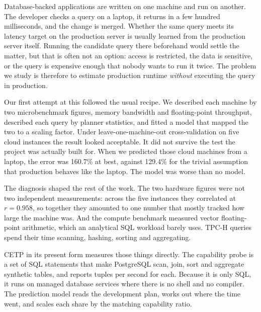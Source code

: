 \documentclass[runningheads]{llncs}
\begin{document}
Database-backed applications are written on one machine and run on another.
The developer checks a query on a laptop, it returns in a few hundred
milliseconds, and the change is merged. Whether the same query meets its
latency target on the production server is usually learned from the production
server itself. Running the candidate query there beforehand would settle the
matter, but that is often not an option: access is restricted, the data is
sensitive, or the query is expensive enough that nobody wants to run it twice.
The problem we study is therefore to estimate production runtime
\emph{without} executing the query in production.

Our first attempt at this followed the usual recipe. We described each machine
by two microbenchmark figures, memory bandwidth and floating-point throughput,
described each query by planner statistics, and fitted a model that mapped the
two to a scaling factor. Under leave-one-machine-out cross-validation on five
cloud instances the result looked acceptable. It did not survive the test the
project was actually built for. When we predicted those cloud machines from a
laptop, the error was 160.7\% at best, against 129.4\% for the trivial
assumption that production behaves like the laptop. The model was worse than
no model.

The diagnosis shaped the rest of the work. The two hardware figures were not
two independent measurements: across the five instances they correlated at
$r = 0.958$, so together they amounted to one number that mostly tracked how
large the machine was. And the compute benchmark measured vector
floating-point arithmetic, which an analytical SQL workload barely uses.
TPC-H queries spend their time scanning, hashing, sorting and aggregating.

CETP in its present form measures those things directly. The capability probe
is a set of SQL statements that make PostgreSQL scan, join, sort and aggregate
synthetic tables, and reports tuples per second for each. Because it is only
SQL, it runs on managed database services where there is no shell and no
compiler. The prediction model reads the development plan, works out where
the time went, and scales each share by the matching capability ratio.
\end{document}
